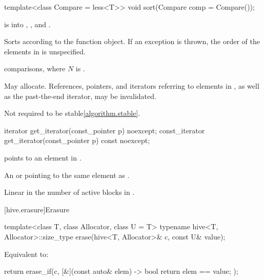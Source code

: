 %
\begin{itemdecl}
template<class Compare = less<T>>
  void sort(Compare comp = Compare());
\end{itemdecl}

\begin{itemdescr}
\pnum
\expects
{} is  into ,
, and .

\pnum
\effects
Sorts  according to the  function object.
If an exception is thrown,
the order of the elements in  is unspecified.

\pnum
\complexity
{} comparisons, where $N$ is .

\pnum
\remarks
May allocate.
References, pointers, and iterators referring to elements in ,
as well as the past-the-end iterator, may be invalidated.
\begin{note}
Not required to be stable\ref{algorithm.stable}.
\end{note}
\end{itemdescr}

%
\begin{itemdecl}
iterator get_iterator(const_pointer p) noexcept;
const_iterator get_iterator(const_pointer p) const noexcept;
\end{itemdecl}

\begin{itemdescr}
\pnum
\expects
{} points to an element in .

\pnum
\returns
An  or 
pointing to the same element as .

\pnum
\complexity
Linear in the number of active blocks in .
\end{itemdescr}

[hive.erasure]{Erasure}

%
\begin{itemdecl}
template<class T, class Allocator, class U = T>
  typename hive<T, Allocator>::size_type
    erase(hive<T, Allocator>& c, const U& value);
\end{itemdecl}

\begin{itemdescr}
\pnum
\effects
Equivalent to:
\begin{codeblock}
return erase_if(c, [&](const auto& elem) -> bool { return elem == value; });
\end{codeblock}
\end{itemdescr}

